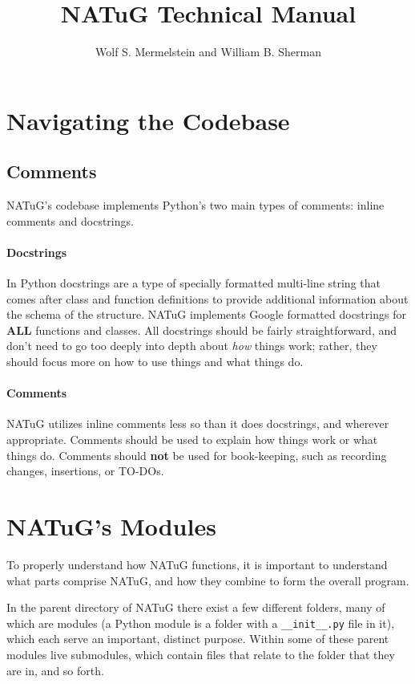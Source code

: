 \documentclass[titlepage]{article}
\title{NATuG Technical Manual}
\author{Wolf S. Mermelstein and William B. Sherman}
\begin{document}
	\maketitle
	\tableofcontents 
	\newpage
	
	\section{Navigating the Codebase}
	
	\subsection{Comments}
	
	NATuG's codebase implements Python's two main types of comments: inline comments and docstrings.
	
	\paragraph{Docstrings}
	In Python docstrings are a type of specially formatted multi-line string that comes after class and function definitions to provide additional information about the schema of the structure. NATuG implements Google formatted docstrings for \textbf{ALL} functions and classes. All docstrings should be fairly straightforward, and don't need to go too deeply into depth about \textit{how} things work; rather, they should focus more on how to use things and what things do.
	
	\paragraph{Comments}
	NATuG utilizes inline comments less so than it does docstrings, and wherever appropriate. Comments should be used to explain how things work or what things do. Comments should \textbf{not} be used for book-keeping, such as recording changes, insertions, or TO-DOs.
	
	\section{NATuG's Modules}
	To properly understand how NATuG functions, it is important to understand what parts comprise NATuG, and how they combine to form the overall program.
	
	In the parent directory of NATuG there exist a few different folders, many of which are modules (a Python module is a folder with a \texttt{\_\_init\_\_.py} file in it), which each serve an important, distinct purpose. Within some of these parent modules live submodules, which contain files that relate to the folder that they are in, and so forth.
	
\end{document}

